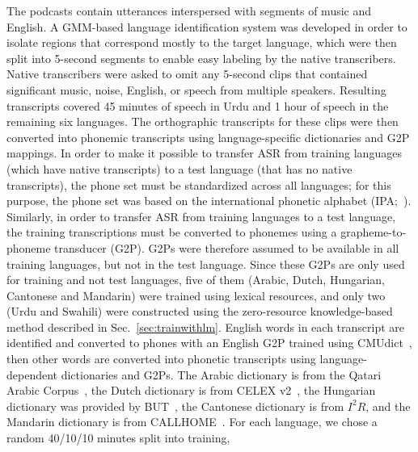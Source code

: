 The podcasts contain utterances interspersed with segments of music
and English. A GMM-based language identification system was
developed in order to isolate
regions that correspond mostly to the target language, which
were then split into 5-second
segments to enable easy labeling by the native transcribers.
Native transcribers were asked to omit any 5-second clips that
contained significant music, noise, English, or speech from multiple
speakers. Resulting transcripts covered 45 minutes of speech in Urdu
and 1 hour of speech in the remaining six languages. The orthographic
transcripts for these clips were then converted into phonemic
transcripts using language-specific dictionaries and G2P mappings.
{\color{blue} In order to make it possible to transfer ASR from
  training languages (which have native transcripts) to a test
  language (that has no native transcripts), the phone set must be
  standardized across all languages; for this purpose, the phone set
  was based on the international phonetic alphabet
  (IPA;~\cite{ipa1993}).  Similarly, in order to transfer ASR from
  training languages to a test language, the training transcriptions
  must be converted to phonemes using a grapheme-to-phoneme transducer
  (G2P).  G2Ps were therefore assumed to be available in all training
  languages, but not in the test language.  Since these G2Ps are only
  used for training and not test languages, five of them (Arabic,
  Dutch, Hungarian, Cantonese and Mandarin) were trained using lexical
  resources, and only two (Urdu and Swahili) were constructed using
  the zero-resource knowledge-based method described in
  Sec.~\ref{sec:trainwithlm}.}  English words in each transcript are
identified and converted to phones with an English G2P trained using
CMUdict~\cite{Lenzo1995}, then other words are converted into phonetic
transcripts using language-dependent dictionaries and G2Ps.
The Arabic dictionary is from the Qatari Arabic Corpus~\cite{Elmahdy14},
the Dutch dictionary is from CELEX v2~\cite{Baayen96},
the Hungarian dictionary was provided by BUT~\cite{Grezl14},
the Cantonese dictionary is from $I^2R$,
and the Mandarin dictionary is from CALLHOME~\cite{LDC96}.
For
each language, we chose a random 40/10/10 minutes split into training,
